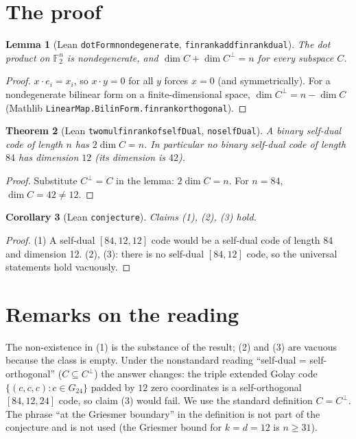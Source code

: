 \documentclass[11pt]{article}
\renewcommand{\_}{\oldus\allowbreak}
\newtheorem{theorem}{Theorem}
\newtheorem{lemma}[theorem]{Lemma}
\newtheorem{corollary}[theorem]{Corollary}
\theoremstyle{definition}
\theoremstyle{remark}
\begin{document}
\section{The proof}

\begin{lemma}[Lean \texttt{dotForm\_nondegenerate}, \texttt{finrank\_add\_finrank\_dual}]
The dot product on $\mathbb{F}_2^n$ is nondegenerate, and $\dim C + \dim C^\perp = n$ for every subspace $C$.
\end{lemma}
\begin{proof}
$x \cdot e_i = x_i$, so $x \cdot y = 0$ for all $y$ forces $x = 0$ (and symmetrically). For a nondegenerate
bilinear form on a finite-dimensional space, $\dim C^\perp = n - \dim C$ (Mathlib
\texttt{LinearMap.BilinForm.finrank\_orthogonal}).
\end{proof}

\begin{theorem}[Lean \texttt{two\_mul\_finrank\_of\_selfDual}, \texttt{no\_selfDual\_84\_12}]
A binary self-dual code of length $n$ has $2\dim C = n$. In particular no binary self-dual code of length
$84$ has dimension $12$ (its dimension is $42$).
\end{theorem}
\begin{proof}
Substitute $C^\perp = C$ in the lemma: $2 \dim C = n$. For $n = 84$, $\dim C = 42 \ne 12$.
\end{proof}

\begin{corollary}[Lean \texttt{conjecture\_1016}]
Claims (1), (2), (3) hold.
\end{corollary}
\begin{proof}
(1) A self-dual $[84,12,12]$ code would be a self-dual code of length 84 and dimension 12. (2), (3): there
is no self-dual $[84,12]$ code, so the universal statements hold vacuously.
\end{proof}

\section{Remarks on the reading}

The non-existence in (1) is the substance of the result; (2) and (3) are vacuous because the class is
empty. Under the nonstandard reading ``self-dual = self-orthogonal'' ($C \subseteq C^\perp$) the answer
changes: the triple extended Golay code $\{(c,c,c) : c \in G_{24}\}$ padded by $12$ zero coordinates is a
self-orthogonal $[84,12,24]$ code, so claim (3) would fail. We use the standard definition $C = C^\perp$.
The phrase ``at the Griesmer boundary'' in the definition is not part of the conjecture and is not used
(the Griesmer bound for $k = d = 12$ is $n \ge 31$).
\end{document}
